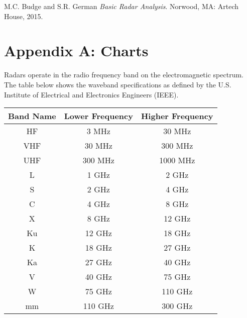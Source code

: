 \documentclass[12pt]{article}
\begin{document}
\pagebreak
\begin{thebibliography}{9}
     M.C. Budge and S.R. German \textit{Basic Radar Analysis}. Norwood, MA: Artech House, 2015.
\end{thebibliography}

\pagebreak
\section{Appendix A: Charts}
Radars operate in the radio frequency band on the electromagnetic spectrum. The table below shows the waveband specifications as defined by the U.S. Institute of Electrical and Electronics Engineers (IEEE).
\begin{center}
    \begin{tabular}{ |c|c|c| }
        \hline
            Band Name & Lower Frequency & Higher Frequency \\
        \hline
        \hline
            HF & 3 MHz & 30 MHz \\
            VHF & 30 MHz & 300 MHz \\
            UHF & 300 MHz & 1000 MHz \\
            L & 1 GHz & 2 GHz \\
            S & 2 GHz & 4 GHz \\
            C & 4 GHz & 8 GHz \\
            X & 8 GHz & 12 GHz \\
            Ku & 12 GHz & 18 GHz \\
            K & 18 GHz & 27 GHz \\
            Ka & 27 GHz & 40 GHz \\
            V & 40 GHz & 75 GHz \\
            W & 75 GHz & 110 GHz \\
            mm & 110 GHz & 300 GHz \\
        \hline
    \end{tabular}
\end{center}
\end{document}
